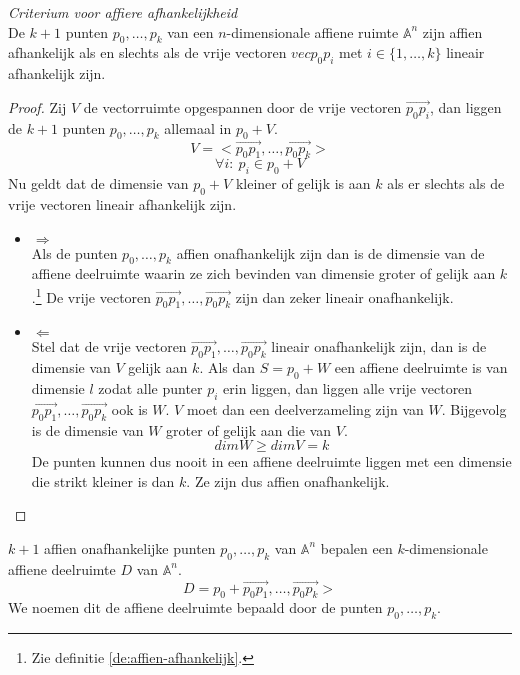 \documentclass[main.tex]{subfiles}
\begin{document}
\begin{st}
  \emph{Criterium voor affiere afhankelijkheid}\\
  De $k+1$ punten $p_{0},\dotsc,p_{k}$ van een $n$-dimensionale affiene ruimte $\mathbb{A}^{n}$ zijn affien afhankelijk als en slechts als de vrije vectoren $vec{p_{0}p_{i}}$ met $i \in \{1,\dotsc,k\}$ lineair afhankelijk zijn.

  \begin{proof}
    Zij $V$ de vectorruimte opgespannen door de vrije vectoren $\overrightarrow{p_{0}p_{i}}$, dan liggen de $k+1$ punten $p_{0},\dotsc,p_{k}$ allemaal in $p_{0} + V$.
    \[ V = <\overrightarrow{p_{0}p_{1}},\dotsc,\overrightarrow{p_{0}p_{k}}> \]
    \[ \forall i:\ p_{i} \in p_{0}+V \]
    Nu geldt dat de dimensie van $p_{0} + V$ kleiner of gelijk is aan $k$ als er slechts als de vrije vectoren lineair afhankelijk zijn.
    \begin{itemize}
    \item $\Rightarrow$\\
      Als de punten $p_{0},\dotsc,p_{k}$ affien onafhankelijk zijn dan is de dimensie van de affiene deelruimte waarin ze zich bevinden van dimensie groter of gelijk aan $k$.\footnote{Zie definitie \ref{de:affien-afhankelijk}.}
      De vrije vectoren $\overrightarrow{p_{0}p_{1}},\dotsc,\overrightarrow{p_{0}p_{k}}$ zijn dan zeker lineair onafhankelijk.
    \item $\Leftarrow$\\
      Stel dat de vrije vectoren $\overrightarrow{p_{0}p_{1}},\dotsc,\overrightarrow{p_{0}p_{k}}$ lineair onafhankelijk zijn, dan is de dimensie van $V$ gelijk aan $k$.
      Als dan $S = p_{0}+W$ een affiene deelruimte is van dimensie $l$ zodat alle punter $p_{i}$ erin liggen, dan liggen alle vrije vectoren $\overrightarrow{p_{0}p_{1}},\dotsc,\overrightarrow{p_{0}p_{k}}$ ook is $W$. $V$ moet dan een deelverzameling zijn van $W$. Bijgevolg is de dimensie van $W$ groter of gelijk aan die van $V$.
      \[ dim W \ge dim V = k \]
      De punten kunnen dus nooit in een affiene deelruimte liggen met een dimensie die strikt kleiner is dan $k$.
      Ze zijn dus affien onafhankelijk.
    \end{itemize}
  \end{proof}
\end{st}

\begin{gev}
  $k+1$ affien onafhankelijke punten $p_{0},\dotsc,p_{k}$ van $\mathbb{A}^{n}$ bepalen een $k$-dimensionale affiene deelruimte $D$ van $\mathbb{A}^{n}$.
  \[ D = p_{0} + \overrightarrow{p_{0}p_{1}},\dotsc,\overrightarrow{p_{0}p_{k}}> \]
  We noemen dit de affiene deelruimte bepaald door de punten $p_{0},\dotsc,p_{k}$.

\end{gev}
\end{document}
